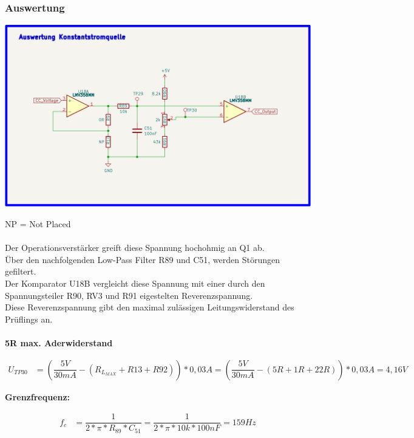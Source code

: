 \subsubsection{Auswertung}
\begin{center}
\includegraphics[width=15cm]{Bilder/Auswertung.png}
\end{center}
NP = Not Placed
\\
\\
Der Operationsverstärker greift diese Spannung hochohmig an Q1 ab. 
\\
Über den nachfolgenden Low-Pass Filter R89 und C51, werden Störungen gefiltert.
\\
Der Komparator U18B vergleicht diese Spannung mit einer durch den Spannungsteiler R90, RV3 und R91 eigestelten Reverenzspannung. 
\\
Diese Reverenzspannung gibt den maximal zulässigen Leitungswiderstand des Prüflings an. 
\\
\\
\textbf{5R max. Aderwiderstand}
\\
\begin{center}
\begin{align*}
	U_{TP30} &= (\dfrac{5V}{30mA} - (R_{L_{MAX}} + R13 + R92)) * 0,03A = (\dfrac{5V}{30mA} - (5R + 1R + 22R)) * 0,03A = 4,16V
\end{align*}
\end{center}
\textbf{Grenzfrequenz:}
\begin{center}
\begin{align*}
	f_{c} &= \dfrac{1}{2 * \pi * R_{89} * C_{51}} = \dfrac{1}{2 * \pi * 10k * 100nF} = 159Hz
\end{align*}
\end{center}

\newpage
